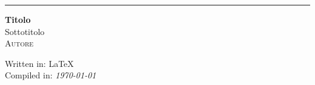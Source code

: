 \begin{titlepage} %
	
	\raggedleft %
	
	\rule{1pt}{\textheight} %
	\hspace{0.05\textwidth} %
	\parbox[b]{0.75\textwidth}{ %
		
		{\Huge\bfseries Titolo}\\[2\baselineskip] %
		{\large Sottotitolo}\\[4\baselineskip]
		{\Large\textsc{Autore}} %
		
		\vspace{0.6\textheight} %
		{Written in: \LaTeX\\Compiled in: \textit{\today}}\\ 
		
		
	}

\end{titlepage}
